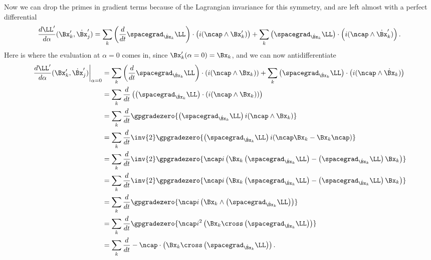 {\begin{equation}
\end{equation}
%
Now we can drop the primes in gradient terms because of the Lagrangian invariance for this symmetry, and are left almost with a
perfect differential
%
\begin{equation}\label{eqn:goldsteinCh12:520}
\frac{d \LL'}{d\alpha} (\Bx_k', \dot{\Bx}_j')
= \sum_{k} \left( \frac{d}{dt} \spacegrad_{\dot{\Bx}_k} \LL\right) \cdot \left( i (\ncap \wedge \Bx_k') \right)
+ \sum_{k} \left( \spacegrad_{\dot{\Bx}_k} \LL\right) \cdot \left( i (\ncap \wedge \dot{\Bx}_k') \right) .
\end{equation}
%
Here is where the evaluation at \(\alpha=0\) comes in, since \(\Bx_k'(\alpha=0) = \Bx_k\), and we can now antidifferentiate
%
\begin{equation}\label{eqn:goldsteinCh12:540}
\begin{aligned}
{\left. \frac{d \LL'}{d\alpha} (\Bx_k', \dot{\Bx}_j') \right\vert}_{\alpha=0}
&= \sum_{k} \left( \frac{d}{dt} \spacegrad_{\dot{\Bx}_k} \LL\right) \cdot \left( i (\ncap \wedge \Bx_k) \right)
+ \sum_{k} \left( \spacegrad_{\dot{\Bx}_k} \LL\right) \cdot \left( i (\ncap \wedge \dot{\Bx}_k) \right) \\
&= \sum_{k} \frac{d}{dt} \left( \left( \spacegrad_{\dot{\Bx}_k} \LL\right) \cdot \left( i (\ncap \wedge \Bx_k) \right) \right) \\
&= \sum_{k} \frac{d}{dt} \gpgradezero{ \left( \spacegrad_{\dot{\Bx}_k} \LL \right) i (\ncap \wedge \Bx_k) } \\
&= \sum_{k} \frac{d}{dt} \inv{2} \gpgradezero{ \left( \spacegrad_{\dot{\Bx}_k} \LL \right) i (\ncap \Bx_k - \Bx_k \ncap) } \\
&= \sum_{k} \frac{d}{dt} \inv{2} \gpgradezero{
\ncap i \left( \Bx_k \left( \spacegrad_{\dot{\Bx}_k} \LL \right) -  \left( \spacegrad_{\dot{\Bx}_k} \LL \right) \Bx_k \right)
} \\
&= \sum_{k} \frac{d}{dt} \inv{2} \gpgradezero{
\ncap i \left( \Bx_k \left( \spacegrad_{\dot{\Bx}_k} \LL \right) -  \left( \spacegrad_{\dot{\Bx}_k} \LL \right) \Bx_k \right)
} \\
&= \sum_{k} \frac{d}{dt} \gpgradezero{
\ncap i \left(\Bx_k \wedge \left( \spacegrad_{\dot{\Bx}_k} \LL \right) \right)
} \\
&= \sum_{k} \frac{d}{dt} \gpgradezero{
\ncap i^2 \left(\Bx_k \cross \left( \spacegrad_{\dot{\Bx}_k} \LL \right) \right)
} \\
&= \sum_{k} \frac{d}{dt} -\ncap \cdot \left(\Bx_k \cross \left( \spacegrad_{\dot{\Bx}_k} \LL \right) \right) .
\end{aligned}

\end{equation}}
